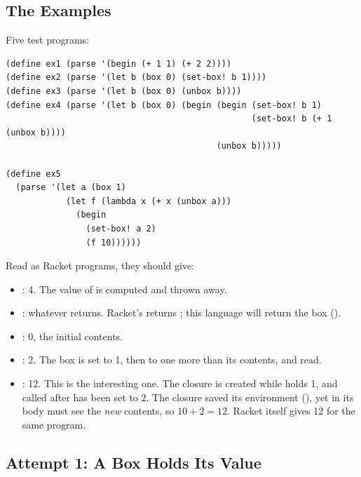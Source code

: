 \subsection{The Examples}

Five test programs:
\begin{lstlisting}
(define ex1 (parse '(begin (+ 1 1) (+ 2 2))))
(define ex2 (parse '(let b (box 0) (set-box! b 1))))
(define ex3 (parse '(let b (box 0) (unbox b))))
(define ex4 (parse '(let b (box 0) (begin (begin (set-box! b 1)
                                                 (set-box! b (+ 1 (unbox b))))
                                          (unbox b)))))

(define ex5
  (parse '(let a (box 1)
            (let f (lambda x (+ x (unbox a)))
              (begin
                (set-box! a 2)
                (f 10))))))
\end{lstlisting}
Read as Racket programs, they should give:
\begin{itemize}
  \item {}: 4. The value of  is computed and thrown away.
  \item {}: whatever  returns. Racket's returns ; this language will return the box ().
  \item {}: 0, the initial contents.
  \item {}: 2. The box is set to 1, then to one more than its contents, and read.
  \item {}: 12. This is the interesting one. The closure  is created while  holds 1, and called after  has been set to 2. The closure saved its environment (), yet  in its body must see the \emph{new} contents, so $10 + 2 = 12$. Racket itself gives 12 for the same program.
\end{itemize}

\subsection{Attempt 1: A Box Holds Its Value}

